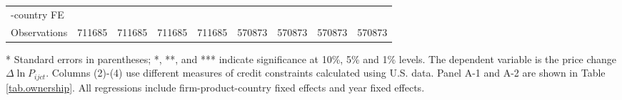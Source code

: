 \documentclass[12pt]{article}
\begin{document}
\begin{table}[htbp]
{\begin{threeparttable}
\begin{tabular}{lllllllll}
		-country FE &&&&&&&& \\
		Observations     & 711685 & 711685 & 711685 & 711685 & 570873 & 570873 & 570873 & 570873 \\
		\bottomrule
	\end{tabular}
	\begin{tablenotes}
		\footnotesize
		\item[*] Standard errors in parentheses; *, **, and *** indicate significance at 10\%, 5\% and 1\% levels. The dependent variable is the price change $\Delta \ln P_{ijct}$. Columns (2)-(4) use different measures of credit constraints calculated using U.S. data. Panel A-1 and A-2 are shown in Table \ref{tab.ownership}. All regressions include firm-product-country fixed effects and year fixed effects.
	\end{tablenotes}
\end{threeparttable}
}
\end{table}
\end{document}
